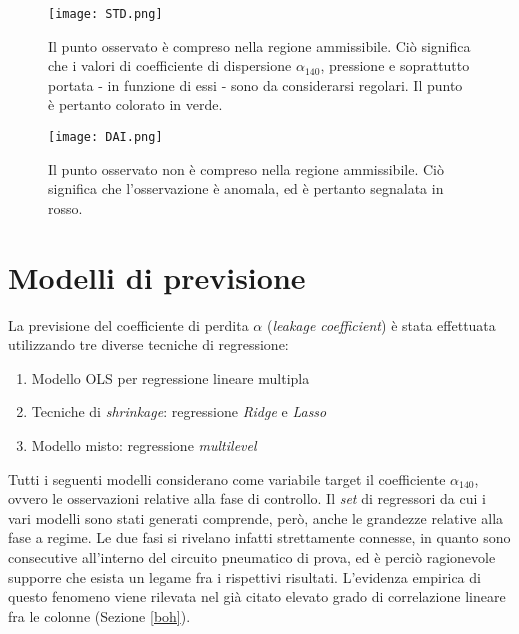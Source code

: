 \documentclass[fleqn,10pt]{SelfArx} %
\begin{document}
\begin{figure}[h]
    \centering
    \texttt{[image: STD.png]}
    \label{fig:em}
    \caption{Il punto osservato è compreso nella regione ammissibile. Ciò significa che i valori di coefficiente di dispersione $\alpha_{140}$, pressione e soprattutto portata - in funzione di essi - sono da considerarsi regolari. Il punto è pertanto colorato in verde.}
\end{figure}
\begin{figure}[h]
    \centering
    \texttt{[image: DAI.png]}
    \label{fig:em}
    \caption{Il punto osservato non è compreso nella regione ammissibile. Ciò significa che l'osservazione è anomala, ed è pertanto segnalata in rosso.}
\end{figure}
\section{Modelli di previsione}\label{Mod}
La previsione del coefficiente di perdita $\alpha$ (\textit{leakage coefficient}) è stata effettuata utilizzando tre diverse tecniche di regressione: 
\begin{enumerate}
    \item Modello OLS per regressione lineare multipla
    \item Tecniche di \textit{shrinkage}: regressione \textit{Ridge} e \textit{Lasso}
    \item Modello misto: regressione \textit{multilevel}
\end{enumerate}
Tutti i seguenti modelli considerano come variabile target il coefficiente $\alpha_{140}$, ovvero le osservazioni relative alla fase di controllo. Il \textit{set} di regressori da cui i vari modelli sono stati generati comprende, però, anche le grandezze relative alla fase a regime. Le due fasi si rivelano infatti strettamente connesse, in quanto sono consecutive all'interno del circuito pneumatico di prova, ed è perciò ragionevole supporre che esista un legame fra i rispettivi risultati. L'evidenza empirica di questo fenomeno viene rilevata nel già citato elevato grado di correlazione lineare fra le colonne (Sezione \ref{boh}).  
\end{document}
